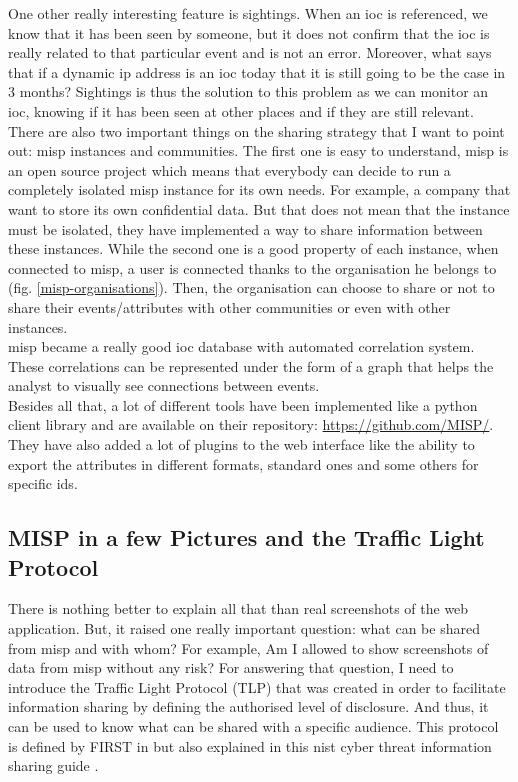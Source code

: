 \documentclass{eplmastersthesis}
\begin{document}
One other really interesting feature is sightings. When an \gls{ioc} is referenced, we know that it has been seen by someone, but it does not confirm that the \gls{ioc} is really related to that particular event and is not an error. Moreover, what says that if a dynamic \gls{ip} address is an \gls{ioc} today that it is still going to be the case in 3 months? 
Sightings is thus the solution to this problem as we can monitor an \gls{ioc}, knowing if it has been seen at other places and if they are still relevant.\\


There are also two important things on the sharing strategy that I want to point out: \gls{misp} instances and communities. The first one is easy to understand, \gls{misp} is an open source project which means that everybody can decide to run a completely isolated \gls{misp} instance for its own needs. For example, a company that want to store its own confidential data. But that does not mean that the instance must be isolated, they have implemented a way to share information between these instances. While the second one is a good property of each instance, when connected to \gls{misp}, a user is connected thanks to the organisation he belongs to (fig. \ref{misp-organisations}). Then, the organisation can choose to share or not to share their events/attributes with other communities or even with other instances. \\ 


\gls{misp} became a really good \gls{ioc} database with automated correlation system. These correlations can be represented under the form of a graph that helps the analyst to visually see connections between events.\\

Besides all that, a lot of different tools have been implemented like a python client library and are available on their repository: \url{https://github.com/MISP/}.
They have also added a lot of plugins to the web interface like the ability to export the attributes in different formats, standard ones and some others for specific \gls{ids}.\\


\subsection{MISP in a few Pictures and the Traffic Light Protocol}
There is nothing better to explain all that than real screenshots of the web application. But, it raised one really important question: what can be shared from \gls{misp} and with whom?
For example, Am I allowed to show screenshots of data from \gls{misp} without any risk?
For answering that question, I need to introduce the Traffic Light Protocol (TLP) that was created in order to facilitate information sharing by defining the authorised level of disclosure. And thus, it can be used to know what can be shared with a specific audience.
This protocol is defined by FIRST in \cite{FirstTLP} but also explained in this \gls{nist} cyber threat information sharing guide \cite{johnson2016guide}.\\
\end{document}
